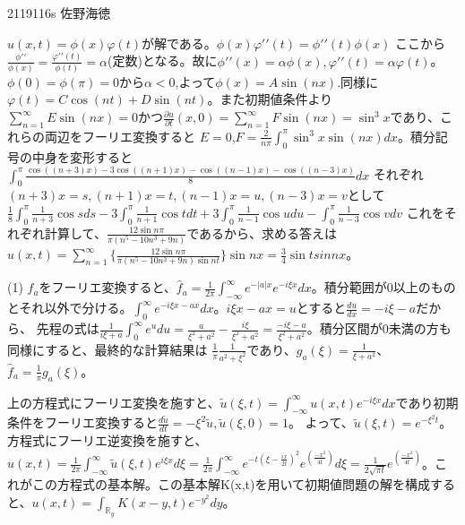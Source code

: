 \documentclass[11pt]{jsarticle}
\begin{document}
2119116s 佐野海徳\\
    \par $u(x,t) = \phi(x)\varphi(t)$が解である。$\phi(x)\varphi{\prime\prime}(t) = \phi{\prime\prime}(t)\phi(x)$
ここから$\frac{\phi{\prime\prime}}{\phi(x)} = \frac{\varphi{\prime\prime}(t)}{\phi(t)} = \alpha$(定数)となる。故に$\phi{\prime\prime}(x) = \alpha\phi(x), \varphi{\prime\prime}(t) = \alpha\varphi(t)$。
    $\phi(0) = \phi(\pi) = 0$から$\alpha < 0$,よって$\phi(x) = A\sin (nx)$.同様に$\varphi(t) = C\cos (nt) + D\sin (nt)$。また初期値条件より
$\sum^{\infty}_{n = 1}E\sin (nx) = 0$かつ$\frac{\partial u}{\partial t}(x,0) = \sum^{\infty}_{n = 1}F\sin (nx) = {\sin}^3 x$であり、これらの両辺をフーリエ変換すると
$E = 0$,$F = \frac{2}{n\pi}\int_{0}^{\pi} {\sin}^3 x \sin (nx) dx$。積分記号の中身を変形すると$\int_{0}^{\pi} \frac{\cos ((n + 3)x) - 3\cos ((n + 1)x) - \cos ((n - 1)x) - \cos((n - 3)x)}{8}dx$
それぞれ$(n + 3)x = s,(n + 1)x = t, (n - 1)x = u,(n - 3)x = v$として$\frac{1}{8}{\int_{0}^{\pi} \frac{1}{n + 3}\cos s ds - 3\int_{0}^{\pi} \frac{1}{n + 1}\cos t dt  + 3\int_{0}^{\pi} \frac{1}{n - 1}\cos u du - \int_{0}^{\pi} \frac{1}{n - 3}\cos v dv}$
これをそれぞれ計算して、$\frac{12\sin n\pi}{\pi(n^5 - 10n^3 + 9n)}$であるから、求める答えは
$u(x,t) = \sum_{n = 1}^{\infty}\{\frac{12\sin n\pi}{\pi(n^5 - 10n^3 + 9n)\sin nt}\} \sin nx = \frac{3}{4}\sin t sin nx$。\newpage
{}
\par(1) $f_a$をフーリエ変換すると、$\hat{f}_a = \frac{1}{2\pi}\int_{-\infty}^{\infty}e^{-|a|x} e^{-i\xi x} dx$。積分範囲が0以上のものとそれ以外で分ける。$\int_{0}^{\infty}e^{-i\xi x - ax} dx$。$i\xi x - ax = u$とすると$\frac{du}{dx} = -i\xi - a$だから、
先程の式は$\frac{1}{i\xi + a}\int_{0}^{\infty}e^u du = \frac{a}{\xi^2 + a^2} - \frac{i\xi}{\xi^2 + a^2} = \frac{-i\xi - a}{\xi^2 + a^2}$。積分区間が0未満の方も同様にすると、最終的な計算結果は
$\frac{1}{\pi}\frac{1}{a^2 + \xi^2}$であり、$g_a(\xi) = \frac{1}{\xi + a^2}$、$\hat{f}_a = \frac{1}{\pi}g_a(\xi)$。\newpage
{}\par 上の方程式にフーリエ変換を施すと、$\tilde{u}(\xi,t) = \int_{-\infty}^{\infty} u(x,t)e^{-i\xi x} dx$であり初期条件をフーリエ変換すると$\frac{d \tilde{u}}{dt} = -{\xi}^2\tilde{u}, \tilde{u}(\xi,0) = 1$。
    よって、$\tilde{u}(\xi, t) = e^{-{\xi}^{2}t}$。方程式にフーリエ逆変換を施すと、$u(x,t) = \frac{1}{2\pi}\int_{-\infty}^{\infty}\tilde{u}(\xi,t)e^{i\xi x} d\xi = \frac{1}{2\pi}\int_{-\infty}^{\infty}e^{-t(\xi - \frac{ix}{2t})^2} e^(\frac{-x^2}{4t})d\xi
= \frac{1}{2\sqrt{\pi t}}e^(\frac{-x^2}{4t})$。これがこの方程式の基本解。この基本解K(x,t)を用いて初期値問題の解を構成すると、$u(x,t) = \int_{\mathbb{R}_y} K(x - y,t)e^{-y^2} dy$。
\end{document}
